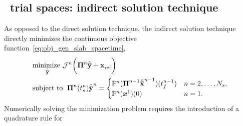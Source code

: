 \subsection{\spaceTimeAcronym\ trial spaces: indirect solution technique}
As opposed to the direct solution technique, the indirect solution technique directly minimizes the continuous objective function~\eqref{eq:obj_gen_slab_spacetime},
\begin{equation}\label{eq:obj_gen_slab2}
\begin{split}
 & \underset{\stgenstatey}{\text{minimize }} \mathcal{J}^n \bigg( \stbasisArgnt{n} \stgenstatey + \stateInterceptArg{n}  \bigg) \\  
&\text{subject to } \;  \stbasisArg{n}{\timeStartArg{n}}\stgenstateyArg{n} = \begin{cases} 
\mathbb{P}^n(\stbasisArgnt{n-1}\stgenstateArg{n-1})(\timeEndArg{n-1}) & n = 2,\ldots,\nslabs, \\ 
\mathbb{P}^n(\stateFOMArgnt{1})(0) &
n=1. \end{cases} 
\end{split} 
\end{equation}
Numerically solving the minimization problem requires the introduction of a quadrature rule for 
